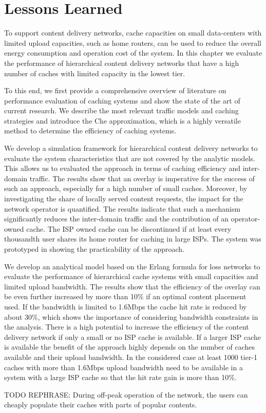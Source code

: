 \section{Lessons Learned}\label{sec:cloud:lessons_learned}
To support content delivery networks, cache capacities on small data-centers with limited upload capacities, such as home routers, can be used to reduce the overall energy consumption and operation cost of the system.
In this chapter we evaluate the performance of hierarchical content delivery networks that have a high number of caches with limited capacity in the lowest tier.

To this end, we first provide a comprehensive overview of literature on performance evaluation of caching systems and show the state of the art of current research.
We describe the most relevant traffic models and caching strategies and introduce the Che approximation, which is a highly versatile method to determine the efficiency of caching systems.

We develop a simulation framework for hierarchical content delivery networks to evaluate the system characteristics that are not covered by the analytic models.
This allows us to evaluated the approach in terms of caching efficiency and inter-domain traffic.
The results show that an overlay is imperative for the success of such an approach, especially for a high number of small caches.
Moreover, by investigating the share of locally served content requests, the impact for the network operator is quantified.
The results indicate that such a mechanism significantly reduces the inter-domain traffic and the contribution of an operator-owned cache.
The ISP owned cache can be discontinued if at least every thousandth user shares its home router for caching in large ISPs.
The system was prototyped in \cite{rbhorst-demo} showing the practicability of the approach.

We develop an analytical model based on the Erlang formula for loss networks to evaluate the performance of hierarchical cache systems with small capacities and limited upload bandwidth.
The results show that the efficiency of the overlay can be even further increased by more than 10\% if an optimal content placement used.
If the bandwidth is limited to 1.6Mbps the cache hit rate is reduced by about 30\%, which shows the importance of considering bandwidth constraints in the analysis.
There is a high potential to increase the efficiency of the content delivery network if only a small or no ISP cache is available.
If a larger ISP cache is available the benefit of the approach highly depends on the number of caches available and their upload bandwidth.
In the considered case at least 1000 tier-1 caches with more than 1.6Mbps upload bandwidth need to be available in a system with a large ISP cache so that the hit rate gain is more than 10\%.

TODO REPHRASE: During off-peak operation of the network, the users can cheaply populate their caches with parts of popular contents.
